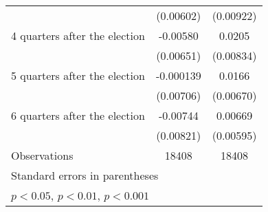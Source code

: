 \begin{table}[htbp]
\begin{tabular}{l*{2}{c}}
                    &   (0.00602)         &   (0.00922)         \\
[1em]
 4 quarters after the election&    -0.00580         &      0.0205\sym{*}  \\
                    &   (0.00651)         &   (0.00834)         \\
[1em]
 5 quarters after the election&   -0.000139         &      0.0166\sym{*}  \\
                    &   (0.00706)         &   (0.00670)         \\
[1em]
 6 quarters after the election&    -0.00744         &     0.00669         \\
                    &   (0.00821)         &   (0.00595)         \\
\hline
Observations        &       18408         &       18408         \\
\hline\hline
\multicolumn{3}{l}{\footnotesize Standard errors in parentheses}\\
\multicolumn{3}{l}{\footnotesize \sym{*} \(p<0.05\), \sym{**} \(p<0.01\), \sym{***} \(p<0.001\)}\\
\end{tabular}
\end{table}
